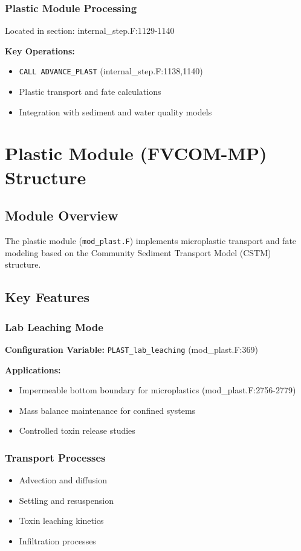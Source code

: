 \documentclass[12pt,a4paper]{article}
\begin{document}
\subsubsection{Plastic Module Processing}
Located in section: internal\_step.F:1129-1140

\textbf{Key Operations:}
\begin{itemize}
    \item \texttt{CALL ADVANCE\_PLAST} (internal\_step.F:1138,1140)
    \item Plastic transport and fate calculations
    \item Integration with sediment and water quality models
\end{itemize}

\section{Plastic Module (FVCOM-MP) Structure}

\subsection{Module Overview}
The plastic module (\texttt{mod\_plast.F}) implements microplastic transport and fate modeling based on the Community Sediment Transport Model (CSTM) structure.

\subsection{Key Features}

\subsubsection{Lab Leaching Mode}
\textbf{Configuration Variable:} \texttt{PLAST\_lab\_leaching} (mod\_plast.F:369)

\textbf{Applications:}
\begin{itemize}
    \item Impermeable bottom boundary for microplastics (mod\_plast.F:2756-2779)
    \item Mass balance maintenance for confined systems
    \item Controlled toxin release studies
\end{itemize}

\subsubsection{Transport Processes}
\begin{itemize}
    \item Advection and diffusion
    \item Settling and resuspension
    \item Toxin leaching kinetics
    \item Infiltration processes
\end{itemize}
\end{document}
